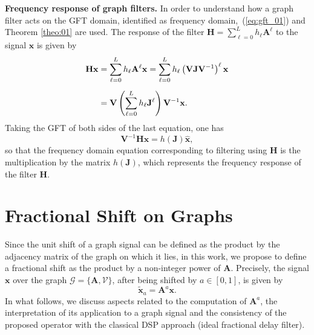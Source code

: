 \vspace{0.25cm}
\noindent\textbf{Frequency response of graph filters.} In order to understand how a graph filter acts on the GFT domain, identified as frequency domain,~(\ref{eq:gft_01}) and Theorem \ref{theo:01} are used. The response of the filter $ \mathbf{H} =\sum_{\ell=0}^{L} h_\ell \mathbf{A}^\ell $ to the signal $ \mathbf{x} $ is given by
\begin{align}\label{eq:resposta_freq_01}
\mathbf{H} \mathbf{x} &= \sum_{\ell=0}^{L} h_\ell \mathbf{A}^\ell \mathbf{x} =
\sum_{\ell=0}^{L} h_\ell \left(\mathbf{V} \mathbf{J} \mathbf{V}^{-1}\right)^\ell \mathbf{x} \notag \\[0.5em]
&= \mathbf{V} \left(\sum_{\ell=0}^{L} h_\ell \mathbf{J}^\ell \right) \mathbf{V}^{-1} \mathbf{x}.
\end{align}
Taking the GFT of both sides of the last equation, one has
\begin{equation}\label{eq:resposta_freq_02}
\mathbf{V}^{-1} \mathbf{H} \mathbf{x} =
h(\mathbf{J}) \widehat{\mathbf{x}},
\end{equation}
so that the frequency domain equation corresponding to filtering using $ \mathbf{H} $ is the multiplication by the matrix $ h(\mathbf{J}) $, which represents the frequency response of the filter $ \mathbf{H} $.

\section{Fractional Shift on Graphs}\label{sec:fracshift}
Since the unit shift of a graph signal can be defined as the product by the adjacency matrix of the graph on which it lies, in this work, we propose to define a fractional shift as the product by a non-integer power of $ \mathbf{A} $. Precisely, the signal $\mathbf{x}$ over the graph $\mathcal{G} = \{ \mathbf{A}, {\mathcal{V}} \}$, after being shifted by $a\in[0,1]$, is given by
\begin{equation}
\label{eq:def_frac_delay}
\widetilde{\mathbf{x}}_a = \mathbf{A}^a \mathbf{x}.
\end{equation}
In what follows, we discuss aspects related to the computation of $\mathbf{A}^a$, the interpretation of its application to a graph signal and the consistency of the proposed operator with the classical DSP approach (ideal fractional delay filter).

